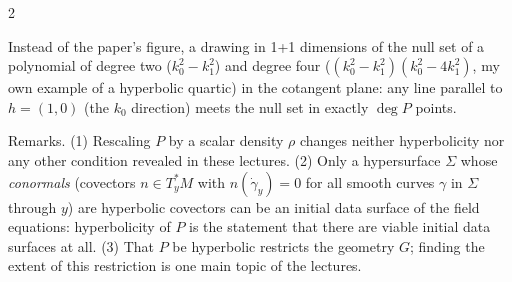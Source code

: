 \begin{paracol}{2}
\begin{nfigure}
\end{nfigure}
\begin{coursenote}
Instead of the paper's figure, a drawing in 1+1 dimensions of the null set of a polynomial of degree two ($k_0^2-k_1^2$) and degree four ($(k_0^2-k_1^2)(k_0^2-4k_1^2)$, my own example of a hyperbolic quartic) in the cotangent plane: any line parallel to $h=(1,0)$ (the $k_0$ direction) meets the null set in exactly $\deg P$ points.
\end{coursenote}

Remarks. (1) Rescaling $P$ by a scalar density $\rho$ changes neither hyperbolicity nor any other condition revealed in these lectures. (2) Only a hypersurface $\Sigma$ whose \emph{conormals} (covectors $n\in T^*_yM$ with $n(\dot\gamma_y)=0$ for all smooth curves $\gamma$ in $\Sigma$ through $y$) are hyperbolic covectors can be an initial data surface of the field equations: hyperbolicity of $P$ is the statement that there are viable initial data surfaces at all. (3) That $P$ be hyperbolic restricts the geometry $G$; finding the extent of this restriction is one main topic of the lectures.


\end{paracol}
